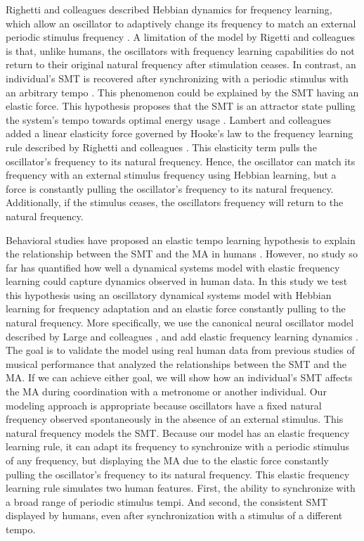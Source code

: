 \documentclass{report}
\begin{document}
Righetti and colleagues described Hebbian dynamics for frequency learning, which allow an oscillator to adaptively change its frequency to match an external periodic stimulus frequency \cite{righetti2009adaptive}. A limitation of the model by Rigetti and colleagues is that, unlike humans, the oscillators with frequency learning capabilities do not return to their original natural frequency after stimulation ceases. In contrast, an individual's SMT is recovered after synchronizing with a periodic stimulus with an arbitrary tempo \cite{scheurich2018tapping}. This phenomenon could be explained by the SMT having an elastic force. This hypothesis proposes that the SMT is an attractor state pulling the system's tempo towards optimal energy usage \cite{mcauley2006time, scheurich2018tapping, strogatz1993coupled}. Lambert and colleagues added a linear elasticity force governed by Hooke's law to the frequency learning rule described by Righetti and colleagues \cite{lambert2016adaptive}. This elasticity term pulls the oscillator's frequency to its natural frequency. Hence, the oscillator can match its frequency with an external stimulus frequency using Hebbian learning, but a force is constantly pulling the oscillator's frequency to its natural frequency. Additionally, if the stimulus ceases, the oscillators frequency will return to the natural frequency.

Behavioral studies have proposed an elastic tempo learning hypothesis to explain the relationship between the SMT and the MA in humans \cite{scheurich2018tapping}. However, no study so far has quantified how well a dynamical systems model with elastic frequency learning could capture dynamics observed in human data. In this study we test this hypothesis using an oscillatory dynamical systems model with Hebbian learning for frequency adaptation and an elastic force constantly pulling to the natural frequency. More specifically, we use the canonical neural oscillator model described by Large and colleagues \cite{large2010canonical}, and add elastic frequency learning dynamics \cite{righetti2009adaptive, lambert2016adaptive}. The goal is to validate the model using real human data from previous studies of musical performance that analyzed the relationships between the SMT and the MA. If we can achieve either goal, we will show how an individual's SMT affects the MA during coordination with a metronome or another individual. Our modeling approach is appropriate because oscillators have a fixed natural frequency observed spontaneously in the absence of an external stimulus. This natural frequency models the SMT. Because our model has an elastic frequency learning rule, it can adapt its frequency to synchronize with a periodic stimulus of any frequency, but displaying the MA due to the elastic force constantly pulling the oscillator's frequency to its natural frequency. This elastic frequency learning rule simulates two human features. First, the ability to synchronize with a broad range of periodic stimulus tempi. And second, the consistent SMT displayed by humans, even after synchronization with a stimulus of a different tempo. 
\end{document}
